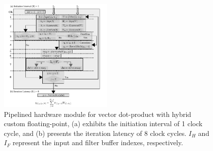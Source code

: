 \begin{figure}[t!]
	\centering
	\includegraphics[width=0.5\textwidth]{../figures/dot_product_hybrid.pdf}
	\caption{Pipelined hardware module for vector dot-product with hybrid custom floating-point, (a) exhibits the initiation interval of 1 clock cycle, and (b) presents
		the iteration latency of 8 clock cycles. $I_H$ and $I_F$ represent the input and filter buffer indexes, respectively.}
	\label{fig:dot_product_hybrid}
\end{figure}
